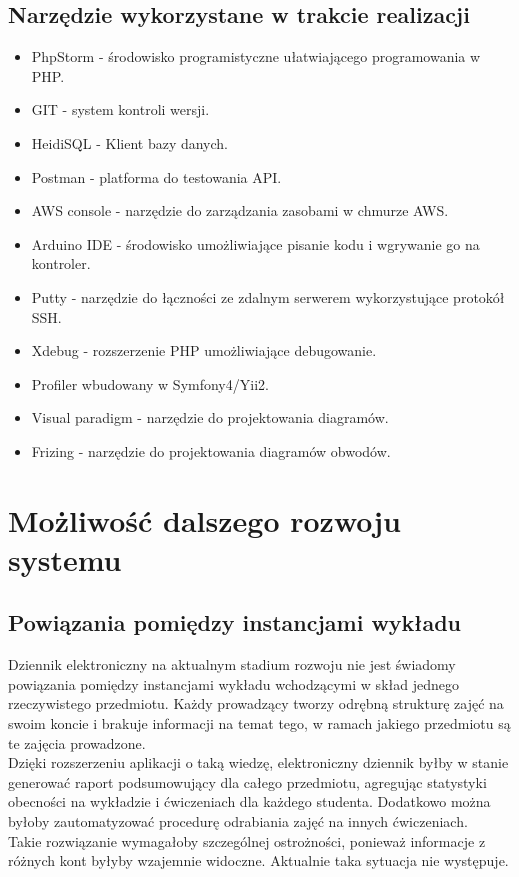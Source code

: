 \documentclass[declaration,shortabstract, mgr]{iithesis}
\begin{document}
\section{Narzędzie wykorzystane w trakcie realizacji}
\begin{itemize}
\item PhpStorm - środowisko programistyczne ułatwiającego programowania w PHP.
\item GIT - system kontroli wersji.
\item HeidiSQL - Klient bazy danych.
\item Postman - platforma do testowania API.
\item AWS console - narzędzie do zarządzania zasobami w chmurze AWS.
\item Arduino IDE - środowisko umożliwiające pisanie kodu i wgrywanie go na kontroler.
\item Putty - narzędzie do łączności ze zdalnym serwerem wykorzystujące protokół SSH.
\item Xdebug - rozszerzenie PHP umożliwiające debugowanie.
\item Profiler wbudowany w Symfony4/Yii2.
\item Visual paradigm - narzędzie do projektowania diagramów.
\item Frizing - narzędzie do projektowania diagramów obwodów.
\end{itemize}

\chapter{Możliwość dalszego rozwoju systemu}
\section{Powiązania pomiędzy instancjami wykładu}
\indent Dziennik elektroniczny na aktualnym stadium rozwoju nie jest świadomy powiązania pomiędzy instancjami wykładu wchodzącymi w skład jednego rzeczywistego przedmiotu. Każdy prowadzący tworzy odrębną strukturę zajęć na swoim koncie i brakuje informacji na temat tego, w ramach jakiego przedmiotu są te zajęcia prowadzone. \\
\indent Dzięki rozszerzeniu aplikacji o taką wiedzę, elektroniczny dziennik byłby w stanie generować raport podsumowujący dla całego przedmiotu, agregując statystyki obecności na wykładzie i ćwiczeniach dla każdego studenta. Dodatkowo można byłoby zautomatyzować procedurę odrabiania zajęć na innych ćwiczeniach. \\
\indent Takie rozwiązanie wymagałoby szczególnej ostrożności, ponieważ informacje z różnych kont byłyby wzajemnie widoczne. Aktualnie taka sytuacja nie występuje.
\end{document}
